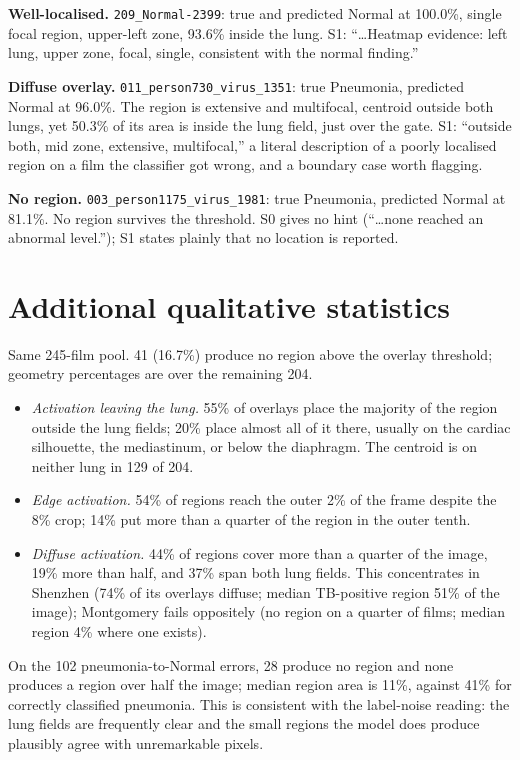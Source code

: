\documentclass{article}
\begin{document}
\textbf{Well-localised.} \texttt{209\_Normal-2399}: true and predicted Normal at 100.0\%, single focal region, upper-left zone, 93.6\% inside the lung. S1: ``\dots Heatmap evidence: left lung, upper zone, focal, single, consistent with the normal finding.''

\textbf{Diffuse overlay.} \texttt{011\_person730\_virus\_1351}: true Pneumonia, predicted Normal at 96.0\%. The region is extensive and multifocal, centroid outside both lungs, yet 50.3\% of its area is inside the lung field, just over the gate. S1: ``outside both, mid zone, extensive, multifocal,'' a literal description of a poorly localised region on a film the classifier got wrong, and a boundary case worth flagging.

\textbf{No region.} \texttt{003\_person1175\_virus\_1981}: true Pneumonia, predicted Normal at 81.1\%. No region survives the threshold. S0 gives no hint (``\dots none reached an abnormal level.''); S1 states plainly that no location is reported.

\section{Additional qualitative statistics}
\label{app:qualitative}

Same 245-film pool. 41 (16.7\%) produce no region above the overlay threshold; geometry percentages are over the remaining 204.

\begin{itemize}
\item \emph{Activation leaving the lung.} 55\% of overlays place the majority of the region outside the lung fields; 20\% place almost all of it there, usually on the cardiac silhouette, the mediastinum, or below the diaphragm. The centroid is on neither lung in 129 of 204.
\item \emph{Edge activation.} 54\% of regions reach the outer 2\% of the frame despite the 8\% crop; 14\% put more than a quarter of the region in the outer tenth.
\item \emph{Diffuse activation.} 44\% of regions cover more than a quarter of the image, 19\% more than half, and 37\% span both lung fields. This concentrates in Shenzhen (74\% of its overlays diffuse; median TB-positive region 51\% of the image); Montgomery fails oppositely (no region on a quarter of films; median region 4\% where one exists).
\end{itemize}

On the 102 pneumonia-to-Normal errors, 28 produce no region and none produces a region over half the image; median region area is 11\%, against 41\% for correctly classified pneumonia. This is consistent with the label-noise reading: the lung fields are frequently clear and the small regions the model does produce plausibly agree with unremarkable pixels.
\end{document}
